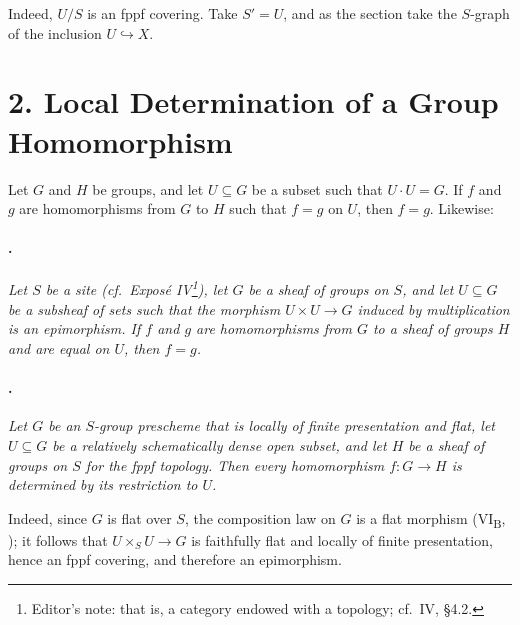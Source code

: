 Indeed, \(U/S\) is an fppf covering. Take \(S'=U\), and as the section
take the \(S\)-graph of the inclusion \(U\hookrightarrow X\).


\section*{2. Local Determination of a
Group Homomorphism}

Let \(G\) and \(H\) be groups, and let \(U\subseteq G\) be a subset
such that \(U\cdot U=G\). If \(f\) and \(g\) are homomorphisms from
\(G\) to \(H\) such that \(f=g\) on \(U\), then \(f=g\). Likewise:

\paragraph{.}
\textit{Let \(S\) be a site (cf.\ Exposé IV\footnote{Editor's note:
that is, a category endowed with a topology; cf.\ IV, \S4.2.}),
let \(G\) be a sheaf of groups on \(S\), and let \(U\subseteq G\) be
a subsheaf of sets such that the morphism \(U\times U\to G\)
induced by multiplication is an epimorphism. If \(f\) and \(g\) are
homomorphisms from \(G\) to a sheaf of groups \(H\) and are equal on
\(U\), then \(f=g\).}

\paragraph{.}
\textit{Let \(G\) be an \(S\)-group prescheme that is locally of
finite presentation and flat, let \(U\subseteq G\) be a relatively
schematically dense open subset, and let \(H\) be a sheaf of groups
on \(S\) for the fppf topology. Then every homomorphism
\(f:G\to H\) is determined by its restriction to \(U\).}

Indeed, since \(G\) is flat over \(S\), the composition law on \(G\)
is a flat morphism (VI\textsubscript{B}, ); it follows that
\(U\times_S U\to G\) is faithfully flat and locally of finite
presentation, hence an fppf covering, and therefore an epimorphism.

